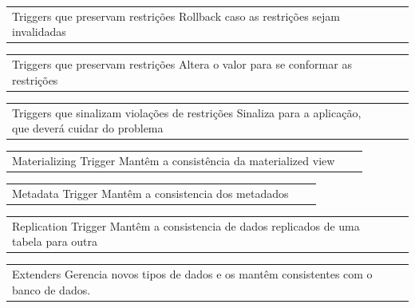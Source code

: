 \documentclass[conference]{IEEEtran}
\begin{document}
    \begin{table}[H]
        \begin{tabular}{p{8cm}p{8cm}p{8cm}}
            \vspace{0pt}
           Triggers que preservam restrições
            \vspace{0pt}
           Rollback caso as restrições sejam invalidadas
        \end{tabular}
        \begin{tabular}{p{8cm}p{8cm}p{8cm}}
            \vspace{0pt}
            Triggers que preservam restrições
            \vspace{0pt}
           Altera o valor para se conformar as restrições
        \end{tabular}
        \begin{tabular}{p{8cm}p{8cm}p{8cm}}
            \vspace{0pt}
            Triggers que sinalizam violações de restrições
            \vspace{0pt}
           Sinaliza para a aplicação, que deverá cuidar do problema
        \end{tabular}
        \begin{tabular}{p{8cm}p{8cm}p{8cm}}
            \vspace{0pt}
            Materializing Trigger
            \vspace{0pt}
           Mantêm a consistência da materialized view
        \end{tabular}
        \begin{tabular}{p{8cm}p{8cm}p{8cm}}
            \vspace{0pt}
           Metadata Trigger
            \vspace{0pt}
           Mantêm a consistencia dos metadados
        \end{tabular}
        \begin{tabular}{p{8cm}p{8cm}p{8cm}}
            \vspace{0pt}
           Replication Trigger
            \vspace{0pt}
           Mantêm a consistencia de dados replicados de uma tabela para outra
        \end{tabular}
        \begin{tabular}{p{8cm}p{8cm}p{8cm}}
            \vspace{0pt}
           Extenders
            \vspace{0pt}
           Gerencia novos tipos de dados e os mantêm consistentes com o banco de dados.

\end{tabular}
\end{table}
\end{document}

